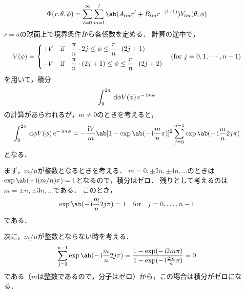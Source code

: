 \begin{enumerate}[label=\fbox{\textbf{\thesection.\arabic*}}]
\begin{enumerate}[(a)]
        \begin{gather}
          \Phi(r, \theta, \phi) = \sum_{l=0}^\infty \sum_{m=l}^{l} \ab(A_{lm}r^l + B_{lm}r^{-(l+1)}) Y_{lm}(\theta,\phi)
        \end{gather}
        $r=a$の球面上で境界条件から各係数を定める．
        計算の途中で，
        \begin{gather}
          V(\phi) = \left\{
            \begin{aligned}
              +V &\hspace{1em} \text{if}\hspace{1em} \frac{\pi}{n}\cdot 2j \leq \phi \leq \frac{\pi}{n}\cdot(2j+1)\\
              -V &\hspace{1em} \text{if}\hspace{1em} \frac{\pi}{n}\cdot (2j+1) \leq \phi \leq \frac{\pi}{n}\cdot(2j+2)\\
            \end{aligned}
          \right. \hspace{1em} (\text{for}\ j = 0, 1, \cdots, n-1)
        \end{gather}
        を用いて，積分
        \begin{gather}
          \int_0^{2\pi} \dl{\phi} V(\phi) \e^{-\i m\phi}
        \end{gather}
        の計算があらわれるが，$m \neq 0$のときを考えると，
        \begin{gather}
          \int_0^{2\pi} \dl{\phi} V(\phi) \e^{-\i m\phi} = -\frac{\i V}{m}\ab[1 - \exp\ab(-\i \frac{m}{n}\pi)]^2 \sum_{j=0}^{n-1} \exp\ab(-\i\frac{m}{n}2j\pi)
        \end{gather}
        となる．

        まず，$m / n$が整数となるときを考える．
        $m = 0, \pm 2n, \pm 4n, \ldots$のときは$\exp\ab(-\i(m/n)\pi) = 1$となるので，積分はゼロ．
        残りとして考えるのは$m = \pm n, \pm 3n, \ldots$である．
        このとき，
        \begin{gather}
          \exp\ab(-\i \frac{m}{n}2j \pi) = 1 \qq \text{for}\qq j = 0, \ldots, n-1
        \end{gather}
        である．

        次に，$m / n$が整数とならない時を考える．
        \begin{gather}
          \sum_{j=0}^{n-1} \exp\ab(-\i \frac{m}{n}2j\pi) = \frac{1 - \exp(-\i 2m\pi)}{1 - \exp(-\i \frac{2m}{n}\pi)} = 0
        \end{gather}
        である（$m$は整数であるので，分子はゼロ）から，この場合は積分がゼロになる．


\end{enumerate}
\end{enumerate}
